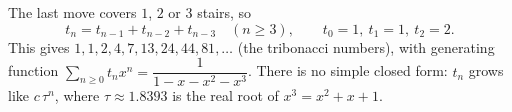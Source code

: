 The last move covers $1$, $2$ or $3$ stairs, so
\[\boxed{t_n=t_{n-1}+t_{n-2}+t_{n-3}}\quad(n\ge3),\qquad t_0=1,\ t_1=1,\ t_2=2.\]
This gives $1,1,2,4,7,13,24,44,81,\dots$ (the tribonacci numbers), with generating function $\displaystyle\sum_{n\ge0}t_nx^n=\dfrac{1}{1-x-x^2-x^3}$. There is no simple closed form: $t_n$ grows like $c\,\tau^n$, where $\tau\approx1.8393$ is the real root of $x^3=x^2+x+1$.
